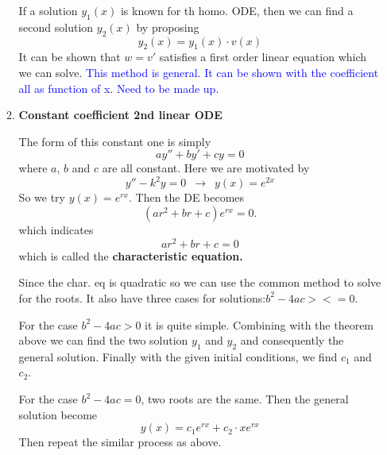 \documentclass[9pt]{article}
\theoremstyle{definition}
\newenvironment{changemargin}[2]{%
  \begin{list}{}{%
    \setlength{\topsep}{0pt}%
    \setlength{\leftmargin}{#1}%
    \setlength{\rightmargin}{#2}%
    \setlength{\listparindent}{\parindent}%
    \setlength{\itemindent}{\parindent}%
    \setlength{\parsep}{\parskip}%
  }%
  \item[]}{\end{list}}
\theoremstyle{theorem}
\theoremstyle{remark}
\theoremstyle{lemma}
\begin{document}
\begin{changemargin}{-0.125in}{0in}
\begin{enumerate}
\begin{enumerate}
      
      \medskip
      
      If a solution $y_1(x)$ is known for th homo. ODE, then we can find a second solution $y_2(x)$ by proposing
      \[
      y_2(x) = y_1(x)\cdot v(x)
      \]
     It can be shown that $w = v'$ satisfies a first order linear  equation which we can solve. \textcolor{blue}{This method is general. It can be shown with the coefficient all as function of x. Need to be made up.}
     
     \medskip
     
     \item \textbf{Constant coefficient 2nd linear ODE}
     
     The form of this constant one is simply 
     \[
     ay'' + by' + cy = 0
     \]
     where $a$, $b$ and $c$ are all constant. Here we are motivated by 
     \[
     y'' - k^2 y = 0\,\,\, \longrightarrow \,\,\, y(x) = e^{2x}
     \]
     So we try $y(x) = e^{rx}$. Then the DE becomes 
     \[
     (ar^2 + br + c) e^{rx} = 0.
     \]
     which indicates 
     \[
     ar^2 + br + c = 0
     \]
     which is called the \textbf{characteristic equation.} 
     
     \medskip
     
     Since the char. eq is quadratic so we can use the common method to solve for the roots. It also have three cases for solutions:$b^2 - 4ac ><= 0$.
     
     \medskip
     
     For the case $b^2 - 4ac>0$ it is quite simple. Combining with the theorem above we can find the two solution $y_1$ and $y_2$ and consequently the general solution. Finally with the given initial conditions, we find $c_1$ and $c_2$. 
     
     
     \medskip
     
     For the case $b^2 - 4ac=0$, two roots are the same. Then the general solution become
     \[
     y(x) = c_1e^{rx} + c_2\cdot x e^{rx}
     \]
     Then repeat the similar process as above.
     
     \medskip
     

\end{enumerate}
\end{enumerate}
\end{changemargin}
\end{document}
